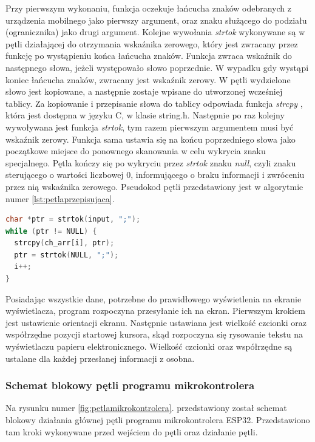 \documentclass[a4paper,12pt, twoside]{article}
\begin{document}
    	Przy pierwszym wykonaniu, funkcja oczekuje łańcucha znaków odebranych z urządzenia mobilnego jako pierwszy argument, oraz znaku służącego do podziału (ogranicznika) jako drugi argument. Kolejne wywołania \textit{strtok} wykonywane są w pętli działającej do otrzymania wskaźnika zerowego, który jest zwracany przez funkcję po wystąpieniu końca łańcucha znaków. Funkcja zwraca wskaźnik do następnego słowa, jeżeli występowało słowo poprzednie. W wypadku gdy wystąpi koniec łańcucha znaków, zwracany jest wskaźnik zerowy. W pętli wydzielone słowo jest kopiowane, a następnie zostaje wpisane do utworzonej wcześniej tablicy. Za kopiowanie i przepisanie słowa do tablicy odpowiada funkcja \textit{strcpy} \cite{strcpy}, która jest dostępna w języku C, w klasie string.h. Następnie po raz kolejny wywoływana jest funkcja \textit{strtok}, tym razem pierwszym argumentem musi być wskaźnik zerowy. Funkcja sama ustawia się na końcu poprzedniego słowa jako początkowe miejsce do ponownego skanowania w celu wykrycia znaku specjalnego. Pętla kończy się po wykryciu przez \textit{strtok} znaku \textit{null}, czyli znaku sterującego o wartości liczbowej 0, informującego o braku informacji\cite{null} i zwróceniu przez nią wskaźnika zerowego. Pseudokod pętli przedstawiony jest w algorytmie numer \ref{lst:petlaprzepisujaca}.
    \begin{lstlisting}[language=C++, label={lst:petlaprzepisujaca}, caption=Działanie pętli przepisującej otrzymane dane do tablicy]
char *ptr = strtok(input, ";");
while (ptr != NULL) {
  strcpy(ch_arr[i], ptr);
  ptr = strtok(NULL, ";");
  i++;
}\end{lstlisting}
    
    	Posiadając wszystkie dane, potrzebne do prawidłowego wyświetlenia na ekranie wyświetlacza, program rozpoczyna przesyłanie ich na ekran. Pierwszym krokiem jest ustawienie orientacji ekranu. Następnie ustawiana jest wielkość czcionki oraz współrzędne pozycji startowej kursora, skąd rozpoczyna się rysowanie tekstu na wyświetlaczu papieru elektronicznego. Wielkość czcionki oraz współrzędne są ustalane dla każdej przesłanej informacji z osobna.
    	
    	\subsubsection{Schemat blokowy pętli programu mikrokontrolera}
    	Na rysunku numer \ref{fig:petlamikrokontrolera}. przedstawiony został schemat blokowy działania głównej pętli programu mikrokontrolera ESP32. Przedstawiono tam kroki wykonywane przed wejściem do pętli oraz działanie pętli.
 
\end{document}
